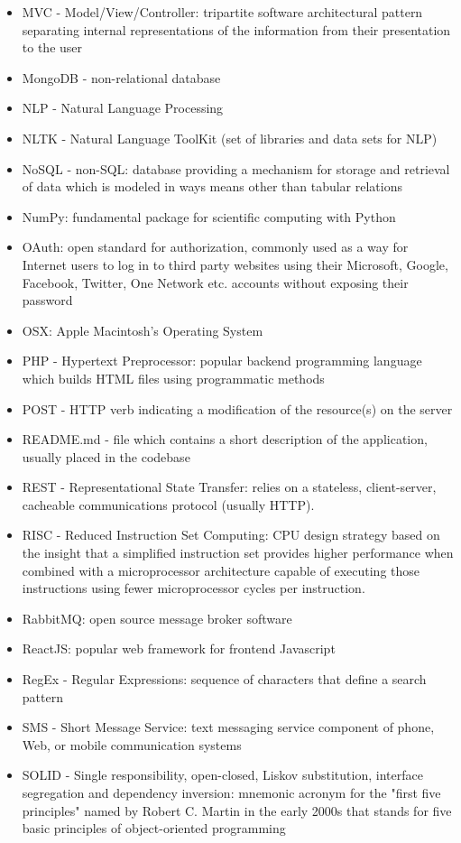 \begin{itemize}
\item MVC - Model/View/Controller: tripartite software architectural pattern separating internal representations of the information from their presentation to the user
\item MongoDB - non-relational database
\item NLP - Natural Language Processing
\item NLTK - Natural Language ToolKit (set of libraries and data sets for NLP)
\item NoSQL - non-SQL: database providing a mechanism for storage and retrieval of data which is modeled in ways means other than tabular relations
\item NumPy: fundamental package for scientific computing with Python
\item OAuth: open standard for authorization, commonly used as a way for Internet users to log in to third party websites using their Microsoft, Google, Facebook, Twitter, One Network etc. accounts without exposing their password
\item OSX: Apple Macintosh's Operating System
\item PHP - Hypertext Preprocessor: popular backend programming language which builds HTML files using programmatic methods
\item POST - HTTP verb indicating a modification of the resource(s) on the server
\item README.md - file which contains a short description of the application, usually placed in the codebase
\item REST - Representational State Transfer: relies on a stateless, client-server, cacheable communications protocol (usually HTTP).
\item RISC - Reduced Instruction Set Computing: CPU design strategy based on the insight that a simplified instruction set provides higher performance when combined with a microprocessor architecture capable of executing those instructions using fewer microprocessor cycles per instruction.
\item RabbitMQ: open source message broker software
\item ReactJS: popular web framework for frontend Javascript
\item RegEx - Regular Expressions: sequence of characters that define a search pattern
\item SMS - Short Message Service: text messaging service component of phone, Web, or mobile communication systems
\item SOLID - Single responsibility, open-closed, Liskov substitution, interface segregation and dependency inversion: mnemonic acronym for the "first five principles" named by Robert C. Martin in the early 2000s that stands for five basic principles of object-oriented programming

\end{itemize}
